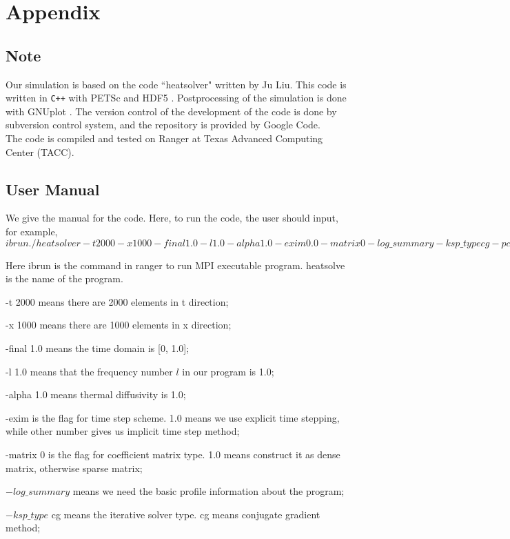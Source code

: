 \documentclass[a4paper,12pt]{article}
\begin{document}
\section{Appendix}
\subsection{Note}
Our simulation is based on the code ``heatsolver" written by Ju Liu. This code is written in \texttt{C++} with {PETS}c \cite{petsc-user-ref} and HDF5 \cite{HDF5}. Postprocessing of the simulation is done with GNUplot \cite{gnuplot}. The version control of the development of the code is done by subversion control system, and the repository is provided by Google Code. \\

The code is compiled and tested on Ranger at Texas Advanced Computing Center (TACC).

\subsection{User Manual}
We give the manual for the code. Here, to run the code, the user should input, for example,\\

\(ibrun ./heatsolver -t 2000 -x 1000 -final 1.0 -l 1.0 -alpha 1.0 -exim 0.0 -matrix 0 -log\_summary -ksp\_type cg -pc\_type jacobi -save 0 -restart 0\)

Here ibrun is the command in ranger to run MPI executable program. heatsolve is the name of the program. 

-t 2000 means there are 2000 elements in t direction;

-x 1000 means there are 1000 elements in x direction;

-final 1.0 means the time domain is [0, 1.0];

-l 1.0 means that the frequency number \(l\) in our program is 1.0;

-alpha 1.0 means thermal diffusivity is 1.0;

-exim is the flag for time step scheme. 1.0 means we use explicit time stepping, while other number gives us implicit time step method;

-matrix 0 is the flag for coefficient matrix type. 1.0 means construct it as dense matrix, otherwise sparse matrix;

\(-log\_summary\) means we need the basic profile information about the program;

\(-ksp\_type\) cg means the iterative solver type. cg means conjugate gradient method;
\end{document}
